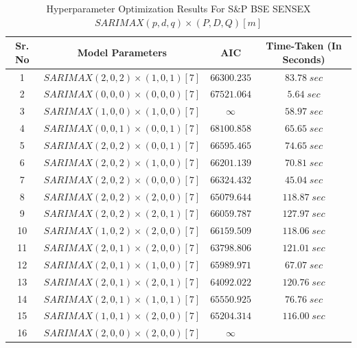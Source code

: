 \documentclass[conference]{IEEEtran}
\begin{document}
\begin{table}[htbp]
    \setlength{\tabcolsep}{20pt}
    \renewcommand{\arraystretch}{1.2}
    \centering
    \caption{Hyperparameter Optimization Results For S\&P BSE SENSEX $SARIMAX(p, d, q) \times (P, D, Q)[m]$}
    \begin{tabular}{|c|c|c|c|}
        \hline
        Sr. No & Model Parameters & AIC & Time-Taken (In Seconds) \\
        \hline
        1 & $SARIMAX(2, 0, 2) \times (1, 0, 1)[7]$ & $66300.235$ & $83.78\;sec$ \\
        \hline
        2 & $SARIMAX(0, 0, 0) \times (0, 0, 0)[7]$ & $67521.064$ & $5.64\;sec$ \\
        \hline
        3 & $SARIMAX(1, 0, 0) \times (1, 0, 0)[7]$ & $\infty$ &
        $58.97\;sec$ \\
        \hline
        4 & $SARIMAX(0, 0, 1) \times (0, 0, 1)[7]$ & $68100.858$ & $65.65\;sec$ \\
        \hline
        5 & $SARIMAX(2, 0, 2) \times (0, 0, 1)[7]$ & $66595.465$ & $74.65\;sec$ \\
        \hline
        6 & $SARIMAX(2, 0, 2) \times (1, 0, 0)[7]$ & $66201.139$ & $70.81\;sec$ \\
        \hline
        7 & $SARIMAX(2, 0, 2) \times (0, 0, 0)[7]$ & $66324.432$ & $45.04\;sec$ \\
        \hline
        8 & $SARIMAX(2, 0, 2) \times (2, 0, 0)[7]$ & $65079.644$ & $118.87\;sec$ \\
        \hline
        9 & $SARIMAX(2, 0, 2) \times (2, 0, 1)[7]$ & $66059.787$ & $127.97\;sec$ \\
        \hline
        10 & $SARIMAX(1, 0, 2) \times (2, 0, 0)[7]$ & $66159.509$ & $118.06\;sec$ \\
        \hline
        11 & $SARIMAX(2, 0, 1) \times (2, 0, 0)[7]$ & $63798.806$ & $121.01\;sec$ \\
        \hline
        12 & $SARIMAX(2, 0, 1) \times (1, 0, 0)[7]$ & $65989.971$ & $67.07\;sec$ \\
        \hline
        13 & $SARIMAX(2, 0, 1) \times (2, 0, 1)[7]$ & $64092.022$ & $120.76\;sec$ \\
        \hline
        14 & $SARIMAX(2, 0, 1) \times (1, 0, 1)[7]$ & $65550.925$ & $76.76\;sec$ \\
        \hline
        15 & $SARIMAX(1, 0, 1) \times (2, 0, 0)[7]$ & $65204.314$ & $116.00\;sec$ \\
        \hline
        16 & $SARIMAX(2, 0, 0) \times (2, 0, 0)[7]$ & $\infty$ &

\end{tabular}
\end{table}
\end{document}
